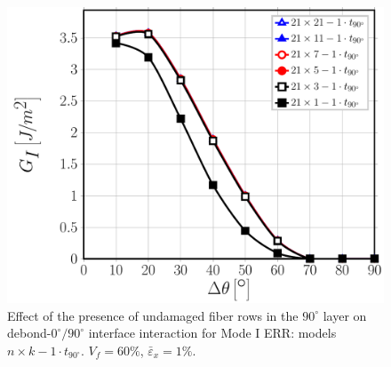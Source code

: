 \begin{figure}[!htb]
\centering
\includegraphics[width=\textwidth]{paperC/nxk-1-vf60-GI.pdf}
\caption{Effect of the presence of undamaged fiber rows in the $90^{\circ}$ layer on debond-$0^{\circ}/90^{\circ}$ interface interaction for Mode I ERR: models $n\times k-1\cdot t_{90^{\circ}}$. $V_{f}=60\%$, $\bar{\varepsilon}_{x}=1\%$.}\label{paperC:fig:nkGI}
\end{figure}

